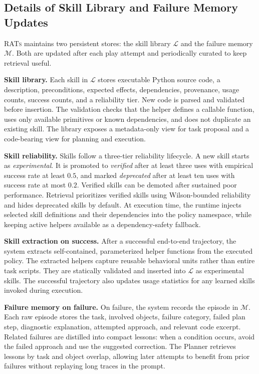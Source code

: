 \subsection{Details of Skill Library and Failure Memory Updates}
\label{sec:appendix_skill_memory}

\textsc{RATs} maintains two persistent stores: the skill library $\mathcal{L}$
and the failure memory $\mathcal{M}$. Both are updated after each play attempt
and periodically curated to keep retrieval useful.

\textbf{Skill library.}
Each skill in $\mathcal{L}$ stores executable Python source code, a
description, preconditions, expected effects, dependencies, provenance, usage
counts, success counts, and a reliability tier. New code is parsed and
validated before insertion. The validation checks that the helper defines a
callable function, uses only available primitives or known dependencies, and
does not duplicate an existing skill. The library exposes a metadata-only view
for task proposal and a code-bearing view for planning and execution.

\textbf{Skill reliability.}
Skills follow a three-tier reliability lifecycle. A new skill starts as
\emph{experimental}. It is promoted to \emph{verified} after at least three
uses with empirical success rate at least $0.5$, and marked
\emph{deprecated} after at least ten uses with success rate at most $0.2$.
Verified skills can be demoted after sustained poor performance. Retrieval
prioritizes verified skills using Wilson-bounded reliability and hides
deprecated skills by default. At execution time, the runtime injects selected
skill definitions and their dependencies into the policy namespace, while
keeping active helpers available as a dependency-safety fallback.

\textbf{Skill extraction on success.}
After a successful end-to-end trajectory, the system extracts self-contained,
parameterized helper functions from the executed policy. The extracted helpers
capture reusable behavioral units rather than entire task scripts. They are
statically validated and inserted into $\mathcal{L}$ as experimental skills.
The successful trajectory also updates usage statistics for any learned skills
invoked during execution.

\textbf{Failure memory on failure.}
On failure, the system records the episode in $\mathcal{M}$. Each raw episode
stores the task, involved objects, failure category, failed plan step,
diagnostic explanation, attempted approach, and relevant code excerpt. Related
failures are distilled into compact lessons: when a condition occurs, avoid the
failed approach and use the suggested correction. The Planner retrieves lessons
by task and object overlap, allowing later attempts to benefit from prior
failures without replaying long traces in the prompt.

